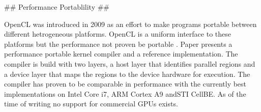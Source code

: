 \begin{markdown}

## Performance Portablility ##

OpenCL \cite{opencl} was introduced in 2009 as an effort to make
programs portable between different hetrogeneous platforms. OpenCL is
a uniform interface to these platforms but the performance not proven
be portable \cite{komatsu2010evaluating}. Paper \cite{pocl} presents a
performance portable kernel compiler and a reference
implementation. The compiler is build with two layers, a host layer
that identifies parallel regions and a device layer that maps the
regions to the device hardware for execution. The compiler has proven
to be comparable in performance with the currently best
implementations on Intel Core i7, ARM Cortex A9 andSTI CellBE.
As of the time of writing no support for commercial GPUs exists.

\end{markdown}
